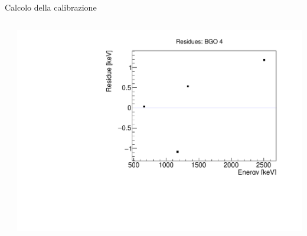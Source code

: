 \documentclass [xcolor=svgnames, 9pt] {beamer}
\begin{document}
\begin{frame}{Calcolo della calibrazione}
\begin{columns}
\begin{column}{0.53\textwidth}
		\end{column}
		\begin{column}{0.47\textwidth}
			
				\centering
				\includegraphics[width=\textwidth]{img/residues0.pdf}
		

\end{column}
\end{columns}
\end{frame}
\end{document}
